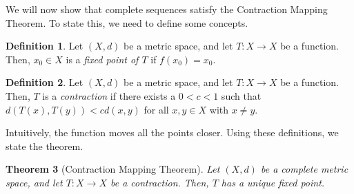 \documentclass[a4paper, openany]{memoir}
\theoremstyle{definition}
\newtheorem{definition}{Definition}[section]
\theoremstyle{plain}
\newtheorem{theorem}[definition]{Theorem}
\begin{document}
We will now show that complete sequences satisfy the Contraction Mapping Theorem. To state this, we need to define some concepts.
\begin{definition}
Let $(X, d)$ be a metric space, and let $T: X \to X$ be a function. Then, $x_0 \in X$ is a \emph{fixed point of $T$} if $f(x_0) = x_0$.
\end{definition}
\begin{definition}
Let $(X, d)$ be a metric space, and let $T: X \to X$ be a function. Then, $T$ is a \emph{contraction} if there exists a $0 < c < 1$ such that $d(T(x), T(y)) < cd(x, y)$ for all $x, y \in X$ with $x \neq y$.
\end{definition}
\noindent Intuitively, the function moves all the points closer. Using these definitions, we state the theorem.
\begin{theorem}[Contraction Mapping Theorem]
Let $(X, d)$ be a complete metric space, and let $T: X \to X$ be a contraction. Then, $T$ has a unique fixed point.
\end{theorem}
\end{document}
